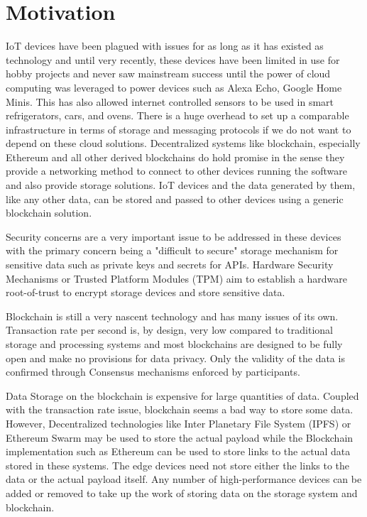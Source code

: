 \documentclass[11pt,openright]{report}
\begin{document}
\section{Motivation}\label{section:motivation}
IoT devices have been plagued with issues for as long as it has existed as technology and until very recently, these devices have been limited in use for hobby projects and never saw mainstream success until the power of cloud computing was leveraged to power devices such as Alexa Echo, Google Home Minis. This has also allowed internet controlled sensors to be used in smart refrigerators, cars, and ovens. There is a huge overhead to set up a comparable infrastructure in terms of storage and messaging protocols if we do not want to depend on these cloud solutions. Decentralized systems like blockchain, especially Ethereum \cite{7467408}  and all other derived blockchains do hold promise in the sense they provide a networking method to connect to other devices running the software and also provide storage solutions. IoT devices and the data generated by them, like any other data, can be stored and passed to other devices using a generic blockchain solution.

Security concerns are a very important issue to be addressed in these devices with the primary concern being a "difficult to secure" storage mechanism for sensitive data such as private keys and secrets for APIs. Hardware Security Mechanisms or Trusted Platform Modules (TPM) aim to establish a hardware root-of-trust to encrypt storage devices and store sensitive data.

Blockchain is still a very nascent technology and has many issues of its own. Transaction rate per second is, by design, very low compared to traditional storage and processing systems and most blockchains are designed to be fully open and make no provisions for data privacy. Only the validity of the data is confirmed through Consensus mechanisms enforced by participants.

Data Storage on the blockchain is expensive for large quantities of data. Coupled with the transaction rate issue, blockchain seems a bad way to store some data. However, Decentralized technologies like Inter Planetary File System (IPFS) or Ethereum Swarm may be used to store the actual payload while the Blockchain implementation such as Ethereum can be used to store links to the actual data stored in these systems. The edge devices need not store either the links to the data or the actual payload itself. Any number of high-performance devices can be added or removed to take up the work of storing data on the storage system and blockchain. 
\end{document}
